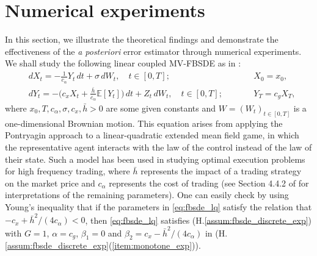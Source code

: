 \documentclass[11pt]{article}
\numberwithin{equation}{section}
\theoremstyle{definition}
\theoremstyle{remark}
\newcommand{\q}{\quad}   \newcommand{\qq}{\qquad}
\def\l{\label}  \def\f{\frac}  \def\fa{\forall}
\def\b{\beta}  \def\a{\alpha} \def\ga{\gamma}
\begin{document}
\section{Numerical experiments}\l{sec:numerical}


In this section, we illustrate the theoretical findings and demonstrate the effectiveness of the 
\textit{a posteriori} error estimator 
 through numerical experiments.
We shall study the following linear coupled MV-FBSDE as in \cite{carmona2018a,andrea2019}:
\begin{subequations}\l{eq:fbsde_lq}
\begin{alignat}{2}
&d X_t = -\frac{1}{c_{\alpha}} Y_t \, dt + \sigma \, dW_t, 
\q t\in [0,T]; 
\qq && X_0=x_0,
\l{eq:fbsde_lq_fwd}
\\
& dY_t = -\bigg( c_x X_t + \frac{\bar{h}}{c_{\alpha}}\mathbb{E}[Y_t] \bigg) \, dt + Z_t \, d W_t,  
\q t\in [0,T];
\l{eq:fbsde_lq_bwd}
\qq 
&& Y_T = c_g X_T,
\end{alignat}
\end{subequations}
where  $x_0, T, c_{\alpha}, \sigma,  c_x , \bar{h}>0$ are some given constants
and $W=(W_t)_{t\in [0,T]}$ is a one-dimensional Brownian motion. 
This equation 
 arises from applying the Pontryagin approach
 to   a  linear-quadratic extended mean field game,
in which the representative agent interacts with the law of the control  instead of the law of their state.
Such a model has been used in studying  optimal execution problems for high frequency trading,
where $\bar{h}$ represents the impact of a trading strategy on the market price
and $c_\a$ represents the  cost of trading
(see Section 4.4.2 of  \cite{andrea2019}
for  interpretations of the remaining parameters).
One can easily check by using Young's inequality that 
 if the  parameters in \eqref{eq:fbsde_lq} satisfy the relation that 
$-c_x+\bar{h}^2/(4c_\a)<0$, 
then
 \eqref{eq:fbsde_lq} satisfies
 (H.\ref{assum:fbsde_discrete_exp})
with 
 $G=1$, 
 $\a=c_g$,
 $\b_1=0$
and
$\b_2=c_x-\bar{h}^2/(4c_\a)$
in (H.\ref{assum:fbsde_discrete_exp}(\ref{item:monotone_exp})).
\end{document}
